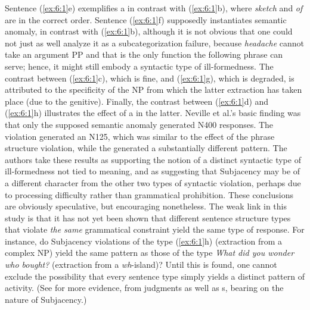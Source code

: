  \noindent
 Sentence (\ref{ex:6:1}e) exemplifies a  in contrast with (\ref{ex:6:1}b), where
 \textit{sketch} and \textit{of} are in the correct order. Sentence (\ref{ex:6:1}f)
 supposedly
 instantiates semantic anomaly, in contrast with (\ref{ex:6:1}b), although it is not obvious that one could not just as well analyze it as a subcategorization failure, because \textit{headache} cannot take an argument PP and that is the only function the following phrase can serve; hence, it might still embody a syntactic type of ill-formedness. The contrast between  (\ref{ex:6:1}c), which  is fine,  and  (\ref{ex:6:1}g), which  is degraded,  is attributed  to  the specificity of the NP from which the latter extraction has taken place (due to the genitive). Finally, the contrast between (\ref{ex:6:1}d) and (\ref{ex:6:1}h) illustrates the effect of a  in the latter. Neville et al.'s basic finding was that only the supposed semantic anomaly generated N400 responses. The   violation generated an N125, which was similar to the effect of the phrase structure violation, while the  generated a substantially different pattern. The authors take these results
 as supporting the notion of a distinct syntactic type of ill-formedness not tied to meaning, and as suggesting that Subjacency may be of a different character from the other two types of syntactic violation, perhaps due to processing difficulty rather than grammatical prohibition. These conclusions are obviously speculative, but encouraging nonetheless. The weak link in this study is that it has not yet been shown that different sentence structure types that violate \textit{the same} grammatical constraint yield the same type of  response. For instance, do Subjacency violations of the type (\ref{ex:6:1}h) (extraction from a complex NP) yield the same pattern as those of the type \textit{What did you wonder who bought?} (extraction from a \textit{wh}-island)? Until this is found, one cannot exclude the possibility that every sentence type simply yields a distinct pattern of activity. (See \citet{KluenderEtAl1993} for more evidence, from judgments as well as s, bearing on the nature of Subjacency.)


